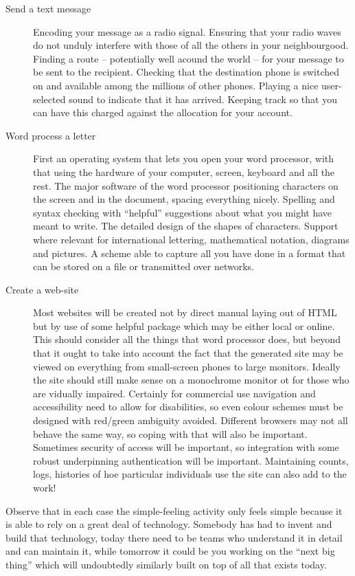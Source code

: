 \begin{description}
\item[Send a text message]
Encoding your message as a radio signal. Ensuring that your radio waves do
not unduly interfere with those of all the others in your neighbourgood.
Finding a route -- potentially well acound the world -- for your message
to be sent to the recipient. Checking that the destination phone is
switched on and available among the millions of other phones. Playing
a nice user-selected sound to indicate that it has arrived. Keeping track
so that you can have this charged against the allocation for your account.
\item[Word process a letter] First an operating system that lets you open
your word processor, with that using the hardware of your computer,
screen, keyboard and all the rest. The major software of the word processor
positioning characters on the screen and in the document, spacing everything
nicely. Spelling and syntax checking with ``helpful'' suggestions about what
you might have meant to write. The detailed design of the shapes of characters.
Support where relevant for international lettering, mathematical notation,
diagrams and pictures. A scheme able to capture all you have done in a
format that can be stored on a file or transmitted over networks.
\item[Create a web-site]
Most websites will be created not by direct manual laying out of HTML but
by use of some helpful package which may be either local or online. This
should consider all the things that word processor does, but beyond that
it ought to take into account the fact that the generated site may be viewed
on everything from small-screen phones to large monitors. Ideally the
site should still make sense on a monochrome monitor ot for those who
are vidually impaired. Certainly for commercial use navigation and
accessibility need to allow for disabilities, so even colour schemes
must be designed with red/green ambiguity avoided. Different browsers may
not all behave the same way, so coping with that will also be important.
Sometimes security of access will be important, so integration with
some robust underpinning authentication will be important. Maintaining
counts, logs, histories of hoe particular individuals use the site can
also add to the work!
\end{description}

Observe that in each case the simple-feeling activity only feels simple
because it is able to rely on a great deal of technology. Somebody has
had to invent and build that technology, today there need to be teams
who understand it in detail and can maintain it, while tomorrow it could
be you working on the ``next big thing'' which will undoubtedly similarly
built on top of all that exists today.

